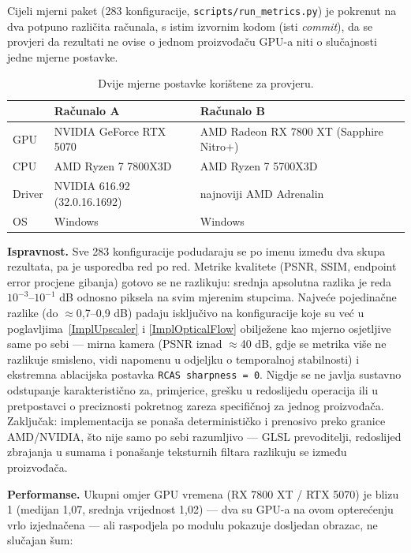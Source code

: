 \documentclass{mathos}
\begin{document}
Cijeli mjerni paket (283 konfiguracije, \verb+scripts/run_metrics.py+) je
pokrenut na dva potpuno različita računala, s istim izvornim kodom (isti
\emph{commit}), da se provjeri da rezultati ne ovise o jednom proizvođaču
GPU-a niti o slučajnosti jedne mjerne postavke.

\begin{table}[hbtp]
\centering
\begin{tabular}{|l|l|l|}\hline
 & Računalo A & Računalo B \\\hline
GPU & NVIDIA GeForce RTX 5070 & AMD Radeon RX 7800 XT (Sapphire Nitro+) \\\hline
CPU & AMD Ryzen 7 7800X3D & AMD Ryzen 7 5700X3D \\\hline
Driver & NVIDIA 616.92 (32.0.16.1692) & najnoviji AMD Adrenalin \\\hline
OS & Windows & Windows \\\hline
\end{tabular}
\caption{Dvije mjerne postavke korištene za provjeru.}
\label{table_hw_setup}
\end{table}

\textbf{Ispravnost.} Sve 283 konfiguracije podudaraju se po imenu između dva
skupa rezultata, pa je usporedba red po red. Metrike kvalitete (PSNR, SSIM,
endpoint error procjene gibanja) gotovo se ne razlikuju: srednja apsolutna
razlika je reda $10^{-3}$--$10^{-1}$ dB odnosno piksela na svim mjerenim
stupcima. Najveće pojedinačne razlike (do $\approx$0,7--0,9 dB) padaju
isključivo na konfiguracije koje su već u poglavljima~\ref{ImplUpscaler} i
\ref{ImplOpticalFlow} obilježene kao mjerno osjetljive same po sebi — mirna
kamera (PSNR iznad $\approx$40 dB, gdje se metrika više ne razlikuje
smisleno, vidi napomenu u odjeljku o temporalnoj stabilnosti) i ekstremna
ablacijska postavka \verb+RCAS sharpness = 0+. Nigdje se ne javlja
sustavno odstupanje karakteristično za, primjerice, grešku u redoslijedu
operacija ili u pretpostavci o preciznosti pokretnog zareza specifičnoj za
jednog proizvođača. Zaključak: implementacija se ponaša determinističko i
prenosivo preko granice AMD/NVIDIA, što nije samo po sebi razumljivo — GLSL
prevoditelji, redoslijed zbrajanja u sumama i ponašanje teksturnih filtara
razlikuju se između proizvođača.

\textbf{Performanse.} Ukupni omjer GPU vremena (RX 7800 XT / RTX 5070) je
blizu 1 (medijan 1,07, srednja vrijednost 1,02) — dva su GPU-a na ovom
opterećenju vrlo izjednačena — ali raspodjela po modulu pokazuje dosljedan
obrazac, ne slučajan šum:
\end{document}
